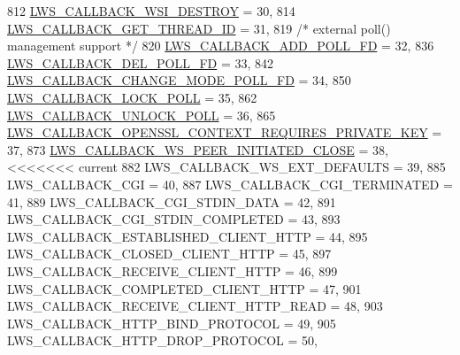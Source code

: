 \begin{DoxyCode}
812         \hyperlink{group__usercb_ggad62860e19975ba4c4af401c3cdb6abf7aca834dc035b7f7486f9ce40fde54fe9e}{LWS\_CALLBACK\_WSI\_DESTROY}                                = 30,
814         \hyperlink{group__usercb_ggad62860e19975ba4c4af401c3cdb6abf7adfb41c92e2522712207ef7f2462b5e34}{LWS\_CALLBACK\_GET\_THREAD\_ID}                            = 31,
819         \textcolor{comment}{/* external poll() management support */}
820         \hyperlink{group__usercb_ggad62860e19975ba4c4af401c3cdb6abf7ab69783a9fbf2ca71ad70706bda77b412}{LWS\_CALLBACK\_ADD\_POLL\_FD}                                = 32,
836         \hyperlink{group__usercb_ggad62860e19975ba4c4af401c3cdb6abf7a1df60f314710236f9b53efbf468da768}{LWS\_CALLBACK\_DEL\_POLL\_FD}                                = 33,
842         \hyperlink{group__usercb_ggad62860e19975ba4c4af401c3cdb6abf7aa87d2e82fffa42c3680c7403ef94216e}{LWS\_CALLBACK\_CHANGE\_MODE\_POLL\_FD}                        = 34,
850         \hyperlink{group__usercb_ggad62860e19975ba4c4af401c3cdb6abf7a8909732521d379179003d97ab7a05428}{LWS\_CALLBACK\_LOCK\_POLL}                                    = 35,
862         \hyperlink{group__usercb_ggad62860e19975ba4c4af401c3cdb6abf7a0e9e3dd667c0c42cdbe1a3d921f4fd79}{LWS\_CALLBACK\_UNLOCK\_POLL}                                = 36,
865         \hyperlink{group__usercb_ggad62860e19975ba4c4af401c3cdb6abf7aa46f705dcf97502e95627ffde614f98b}{LWS\_CALLBACK\_OPENSSL\_CONTEXT\_REQUIRES\_PRIVATE\_KEY}      
      = 37,
873         \hyperlink{group__usercb_ggad62860e19975ba4c4af401c3cdb6abf7ac3fc5bbb55e69f90396526287ee84a51}{LWS\_CALLBACK\_WS\_PEER\_INITIATED\_CLOSE}                        = 
      38,
<<<<<<< current
882         LWS\_CALLBACK\_WS\_EXT\_DEFAULTS                            = 39,
885         LWS\_CALLBACK\_CGI                                        = 40,
887         LWS\_CALLBACK\_CGI\_TERMINATED                             = 41,
889         LWS\_CALLBACK\_CGI\_STDIN\_DATA                             = 42,
891         LWS\_CALLBACK\_CGI\_STDIN\_COMPLETED                        = 43,
893         LWS\_CALLBACK\_ESTABLISHED\_CLIENT\_HTTP                    = 44,
895         LWS\_CALLBACK\_CLOSED\_CLIENT\_HTTP                         = 45,
897         LWS\_CALLBACK\_RECEIVE\_CLIENT\_HTTP                        = 46,
899         LWS\_CALLBACK\_COMPLETED\_CLIENT\_HTTP                      = 47,
901         LWS\_CALLBACK\_RECEIVE\_CLIENT\_HTTP\_READ                   = 48,
903         LWS\_CALLBACK\_HTTP\_BIND\_PROTOCOL                         = 49,
905         LWS\_CALLBACK\_HTTP\_DROP\_PROTOCOL                         = 50,

\end{DoxyCode}
